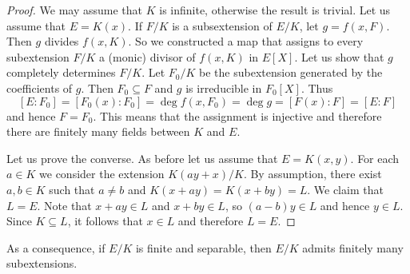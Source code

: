 \begin{proof}
    We may assume that $K$ is infinite, otherwise the result is trivial. Let us 
    assume that $E=K(x)$. If $F/K$ is a subsextension of $E/K$, 
    let $g=f(x,F)$. Then $g$ divides $f(x,K)$. So we constructed a map that assigns 
    to every subextension $F/K$ a (monic) divisor of $f(x,K)$ in $E[X]$. Let us show
    that $g$ completely determines $F/K$. Let $F_0/K$ be the subextension
    generated by the coefficients of $g$. Then $F_0\subseteq F$ and $g$ 
    is irreducible in $F_0[X]$. Thus 
    \[
    [E:F_0]=[F_0(x):F_0]=\deg f(x,F_0)=\deg g=[F(x):F]=[E:F]
    \]
    and hence $F=F_0$. This means that the assignment is injective
    and therefore there are finitely many fields between $K$ and $E$. 
    
    Let us prove the converse. 
    As before let us assume that $E=K(x,y)$. For each $a\in K$ we consider
    the extension $K(ay+x)/K$. By assumption, there exist $a,b\in K$ such that
    $a\ne b$ and $K(x+ay)=K(x+by)=L$. We claim that $L=E$. Note that 
    $x+ay\in L$ and $x+by\in L$, so $(a-b)y\in L$ and hence $y\in L$. Since 
    $K\subseteq L$, it follows that $x\in L$ and therefore $L=E$. 
\end{proof}

As a consequence, if $E/K$ is finite and separable, then $E/K$ admits
finitely many subextensions. 

